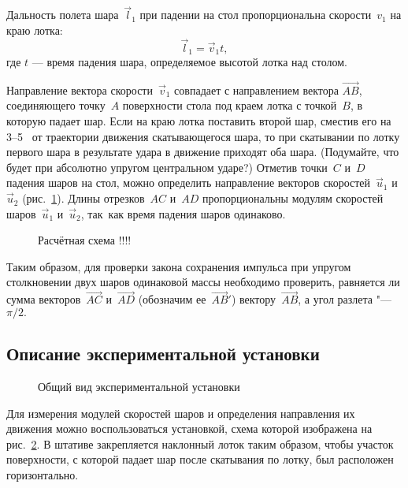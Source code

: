 \documentclass[a4paper, 12pt]{extarticle}
\begin{document}
Дальность полета шара~$\vec l_1$ при падении на стол пропорциональна скорости~$v_1$ на краю лотка:
\[
\vec l_1 = \vec v_1 t,
\]
где $t$ --- время падения шара, определяемое высотой лотка над столом.

Направление вектора скорости~$\vec v_1$ совпадает с направлением вектора $\vec{AB}$, соединяющего точку~$A$ поверхности стола под краем лотка с точкой~$B$, в которую падает шар. Если на краю лотка поставить второй шар, сместив его на 3--5~ от траектории движения скатывающегося шара, то при скатывании по лотку первого шара в результате удара в движение приходят оба шара. (Подумайте, что будет при абсолютно упругом центральном ударе?) Отметив точки~$C$ и~$D$ падения шаров на стол, можно определить направление векторов скоростей~$\vec u_1$ и~$\vec u_2$ (рис.~\ref{fig:m4-impulse-diagram}). Длины отрезков~$AC$ и~$AD$ пропорциональны модулям скоростей шаров~$\vec u_1$ и~$\vec u_2$, так~как время падения шаров одинаково. %

\begin{figure}[b]
\begin{center}
\end{center}
\caption{Расчётная схема \Huge !!!!\label{fig:m4-impulse-diagram}}
\end{figure}

Таким образом, для проверки закона сохранения импульса при упругом столкновении двух шаров одинаковой массы необходимо проверить, равняется ли сумма векторов~$\vec{AC}$ и~$\vec{AD}$ (обозначим ее~$\vec{AB}'$) вектору~$\vec{AB}$, а угол разлета "--- $\pi/2.$

\subsection{Описание экспериментальной установки}

\begin{figure}[b]
\begin{center}
\end{center}
\caption{Общий вид экспериментальной установки \label{fig:m4-equipment}}
\end{figure} %

Для измерения модулей скоростей шаров и определения направления их движения можно воспользоваться установкой, схема которой изображена на рис.~\ref{fig:m4-equipment}. В штативе закрепляется наклонный лоток таким образом, чтобы участок поверхности, с которой падает шар после скатывания по лотку, был расположен горизонтально. %
\end{document}
